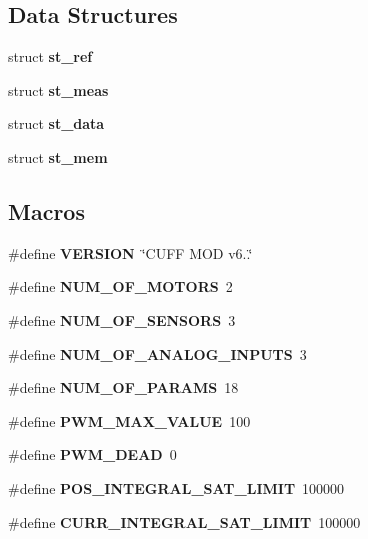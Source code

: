 \subsection*{Data Structures}
\begin{DoxyCompactItemize}
\item 
struct \textbf{ st\+\_\+ref}
\item 
struct \textbf{ st\+\_\+meas}
\item 
struct \textbf{ st\+\_\+data}
\item 
struct \textbf{ st\+\_\+mem}
\end{DoxyCompactItemize}
\subsection*{Macros}
\begin{DoxyCompactItemize}
\item 
\mbox{\label{globals_8h_a1c6d5de492ac61ad29aec7aa9a436bbf}} 
\#define {\bfseries V\+E\+R\+S\+I\+ON}~\char`\"{}C\+U\+FF M\+OD v6..\char`\"{}
\item 
\mbox{\label{globals_8h_a39ac50737c1ee7d5b723b2597fdf6f26}} 
\#define {\bfseries N\+U\+M\+\_\+\+O\+F\+\_\+\+M\+O\+T\+O\+RS}~2
\item 
\mbox{\label{globals_8h_af48a6b6fcdc5f5019fb108d03b07a727}} 
\#define {\bfseries N\+U\+M\+\_\+\+O\+F\+\_\+\+S\+E\+N\+S\+O\+RS}~3
\item 
\mbox{\label{globals_8h_a181be7cbd0b2da8e8bb809e6313bd67f}} 
\#define {\bfseries N\+U\+M\+\_\+\+O\+F\+\_\+\+A\+N\+A\+L\+O\+G\+\_\+\+I\+N\+P\+U\+TS}~3
\item 
\mbox{\label{globals_8h_aab4f4a0ece20c4bc27152bd72926d89c}} 
\#define {\bfseries N\+U\+M\+\_\+\+O\+F\+\_\+\+P\+A\+R\+A\+MS}~18
\item 
\mbox{\label{globals_8h_aafe0521fa22763b7afc50e12d31b450d}} 
\#define {\bfseries P\+W\+M\+\_\+\+M\+A\+X\+\_\+\+V\+A\+L\+UE}~100
\item 
\mbox{\label{globals_8h_ada72214f9e15f255cad72a749211b3df}} 
\#define {\bfseries P\+W\+M\+\_\+\+D\+E\+AD}~0
\item 
\mbox{\label{globals_8h_ad252b8b0421e545cce8ba0548a6ca4ed}} 
\#define {\bfseries P\+O\+S\+\_\+\+I\+N\+T\+E\+G\+R\+A\+L\+\_\+\+S\+A\+T\+\_\+\+L\+I\+M\+IT}~100000
\item 
\mbox{\label{globals_8h_a94ec4e208ccec9fc13d0f57094f6de35}} 
\#define {\bfseries C\+U\+R\+R\+\_\+\+I\+N\+T\+E\+G\+R\+A\+L\+\_\+\+S\+A\+T\+\_\+\+L\+I\+M\+IT}~100000
\item 
\mbox{\label{globals_8h_aff0004301ad937f09b58d17ff3f8c9b3}} 

\end{DoxyCompactItemize}
